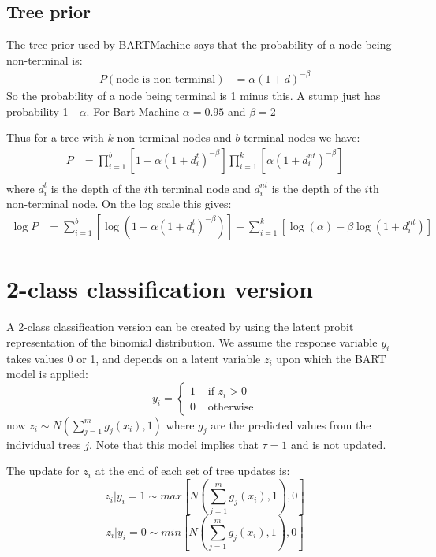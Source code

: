 \documentclass{article}
\begin{document}
\subsection*{Tree prior}

The tree prior used by BARTMachine says that the probability of a node being non-terminal is:
\begin{align*}
P(\mbox{node is non-terminal}) &= \alpha (1 + d)^{-\beta}
\end{align*}
So the probability of a node being terminal is 1 minus this. A stump just has probability 1 - $\alpha$. For Bart Machine $\alpha = 0.95$ and $\beta = 2$

Thus for a tree with $k$ non-terminal nodes and $b$ terminal nodes we have:
\begin{align*}
P &= \prod_{i=1}^b \left[ 1 - \alpha (1 + d^t_i)^{-\beta} \right] \prod_{i=1}^k \left[ \alpha (1 + d^{nt}_i)^{-\beta} \right] \\
\end{align*}
where $d^t_i$ is the depth of the $i$th terminal node and $d^{nt}_i$ is the depth of the $i$th non-terminal node.
On the log scale this gives:
\begin{align}
\log P &= \sum_{i=1}^b \left[ \log \left(1 - \alpha(1 + d^t_i)^{-\beta} \right) \right] + \sum_{i=1}^k \left[ \log(\alpha) - \beta \log(1 + d^{nt}_i) \right]
\end{align}

\section*{2-class classification version}

A 2-class classification version can be created by using the latent probit representation of the binomial distribution. We assume the response variable $y_i$ takes values 0 or 1, and depends on a latent variable $z_i$ upon which the BART model is applied:
$$y_i = \left\{ \begin{array}{ll} 1 & \mbox{ if } z_i > 0 \\ 0 & \mbox{ otherwise} \end{array} \right.$$
now $z_i \sim N \left(\sum_{j=1}^m g_j(x_i), 1\right)$ where $g_j$ are the predicted values from the individual trees $j$. Note that this model implies that $\tau = 1$ and is not updated.

The update for $z_i$ at the end of each set of tree updates is:
$$z_i | y_i = 1 \sim max \left[ N\left(\sum_{j=1}^m g_j(x_i), 1\right), 0 \right]$$
$$z_i | y_i = 0 \sim min \left[ N\left(\sum_{j=1}^m g_j(x_i), 1\right), 0 \right]$$
\end{document}
